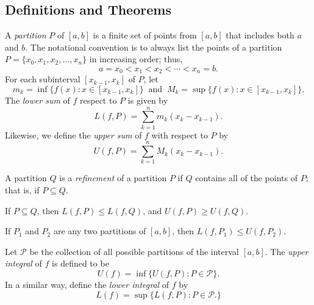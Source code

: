 \subsection{Definitions and Theorems}


\begin{tcolorbox}
\begin{defn}
	A \textit{partition} \( P  \) of \( [a,b]  \) is a finite set of points from \( [a,b]  \) that includes both \( a  \) and \( b  \). The notational convention is to always list the points of a partition \( P = \{ x_{0}, x_{1}, x_{2}, \dots, x_{n} \}  \) in increasing order; thus, \[  a = x_{0} < x_{1} < x_{2} < \dotsb < x_{n} = b. \]
	For each subinterval \( [x_{k-1}, x_{k} ] \) of \( P  \), let 
	\[  m_{k } = \inf \{ f(x) : x \in [x_{k-1} , x_{k } ] \} \ \text{ and } \  M_{k } = \sup \{ f(x) : x \in [x_{k-1}, x_{k }] \}. \]
	The \textit{lower sum} of \( f  \) respect to \( P  \) is given by 
	\[  L(f, P ) = \sum_{ k=1 }^{ n } m_{ k } ( x_{k } -  x_{ k -1 }). \]
	Likewise, we define the \textit{upper sum} of \( f  \) with respect to \( P  \) by 
	\[  U(f, P ) = \sum_{ k=1 }^{ n } M_k ( x_{k } - x_{ k -1 }). \]
\end{defn}
\end{tcolorbox}


\begin{tcolorbox}
\begin{defn}
A partition \( Q  \) is a \textit{refinement} of a partition \( P  \) if \( Q  \) contains all of the points of \( P  \); that is, if \( P \subseteq Q  \).



\end{defn}
\end{tcolorbox}


\begin{tcolorbox}
\begin{lem}
If \( P \subseteq Q  \), then \( L(f,P) \leq L(f,Q)  \), and \( U(f,P ) \geq U(f,Q) \).
\end{lem}
\end{tcolorbox}


\begin{tcolorbox}
\begin{lem}
	If \( P_1  \) and \( P_2  \) are any two partitions of \( [a,b]  \), then \( L(f, P_{1}) \leq U(f, P_2) \).
\end{lem}
\end{tcolorbox}


\begin{tcolorbox}
\begin{defn}
	Let \( \mathcal{P}  \) be the collection of all possible partitions of the interval \( [a,b] \). The \textit{upper integral} of \( f \) is defined to be 
	\[  U(f) = \inf \{ U(f,P) : P \in \mathcal{P} \}.  \]
	In a similar way, define the \textit{lower integral} of \( f  \) by 
	\[  L(f) = \sup \{ L(f,P) : P \in \mathcal{P}. \}  \]
\end{defn}
\end{tcolorbox}



